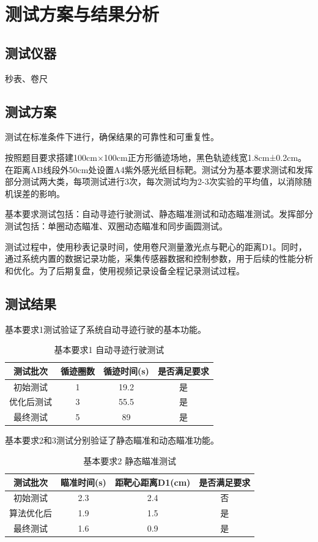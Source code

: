 \documentclass[12pt,a4paper]{ctexart}
\begin{document}
\section{\textbf{测试方案与结果分析}} 
 
\subsection{\textbf{测试仪器}}
秒表、卷尺

\subsection{\textbf{测试方案}}
测试在标准条件下进行，确保结果的可靠性和可重复性。

按照题目要求搭建100cm×100cm正方形循迹场地，黑色轨迹线宽1.8cm±0.2cm。在距离AB线段外50cm处设置A4紫外感光纸目标靶。测试分为基本要求测试和发挥部分测试两大类，每项测试进行3次，每次测试均为2-3次实验的平均值，以消除随机误差的影响。

基本要求测试包括：自动寻迹行驶测试、静态瞄准测试和动态瞄准测试。发挥部分测试包括：单圈动态瞄准、双圈动态瞄准和同步画圆测试。

测试过程中，使用秒表记录时间，使用卷尺测量激光点与靶心的距离D1。同时，通过系统内置的数据记录功能，采集传感器数据和控制参数，用于后续的性能分析和优化。为了后期复盘，使用视频记录设备全程记录测试过程。

\subsection{\textbf{测试结果}}


基本要求1测试验证了系统自动寻迹行驶的基本功能。
\begin{table}[H]
    \centering
    \footnotesize
    \caption{基本要求1 自动寻迹行驶测试}
    \label{tab:basic_req1}
    \begin{tabular}{|c|c|c|c|}
        \hline
        测试批次 & 循迹圈数 & 循迹时间(s) & 是否满足要求 \\
        \hline
        初始测试 & 1 & 19.2 & 是 \\
        \hline
        优化后测试 & 3 & 55.5 & 是 \\
        \hline
        最终测试 & 5 & 89 & 是 \\
        \hline
    \end{tabular}
\end{table}

基本要求2和3测试分别验证了静态瞄准和动态瞄准功能。
\begin{table}[H]
    \centering
    \footnotesize
    \caption{基本要求2 静态瞄准测试}
    \label{tab:basic_req2}
    \begin{tabular}{|c|c|c|c|}
        \hline
        测试批次 & 瞄准时间(s) & 距靶心距离D1(cm) & 是否满足要求 \\
        \hline
        初始测试 & 2.3 & 2.4 & 否 \\
        \hline
        算法优化后 & 1.9 & 1.5 & 是 \\
        \hline
        最终测试 & 1.6 & 0.9 & 是 \\
        \hline
    \end{tabular}
\end{table}
\end{document}
